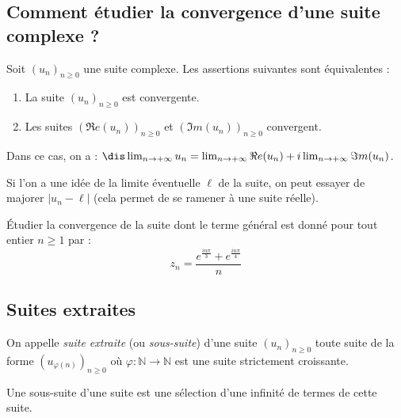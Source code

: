 \documentclass[a4paper,10pt]{report}
\begin{document}
\subsection{Comment étudier la convergence d'une suite complexe ?}

\begin{prop} Soit $(u_n)_{n \geq 0}$ une suite complexe. Les assertions suivantes sont équivalentes :

\begin{enumerate}
\item La suite $(u_n)_{n \geq 0}$ est convergente.
\item Les suites $(\Re e(u_n))_{n \geq 0}$ et $(\Im m(u_n))_{n \geq 0}$ convergent.
\end{enumerate}

\noindent Dans ce cas, on a : $\dis \lim_{n \rightarrow + \infty} u_n = \lim_{n \rightarrow + \infty} \Re e(u_n) + i \lim_{n \rightarrow + \infty} \Im m(u_n)$.
\end{prop}

\begin{rem} Si l'on a une idée de la limite éventuelle $\ell$ de la suite, on peut essayer de majorer $\vert u_n- \ell \vert$ (cela permet de se ramener à une suite réelle).
\end{rem}

\begin{ex} Étudier la convergence de la suite dont le terme général est donné pour tout entier $n \geq 1$ par : 
$$ z_n = \frac{e^{\frac{i n \pi}{3}} + e^{\frac{i n \pi}{4}}}{n} $$ 

\vspace{4cm}
\end{ex}

\subsection{Suites extraites}

\begin{defin} On appelle \textit{suite extraite} (ou \textit{sous-suite}) d'une suite $(u_n)_{n \geq 0}$ toute suite de la forme $(u_{\varphi(n)})_{n \geq 0}$ où \linebreak $\varphi : \mathbb{N} \rightarrow \mathbb{N}$ est une suite strictement croissante.
\end{defin}

\begin{rem} Une sous-suite d'une suite est une \og sélection \fg d'une infinité de termes de cette suite.
\end{rem}
\end{document}
